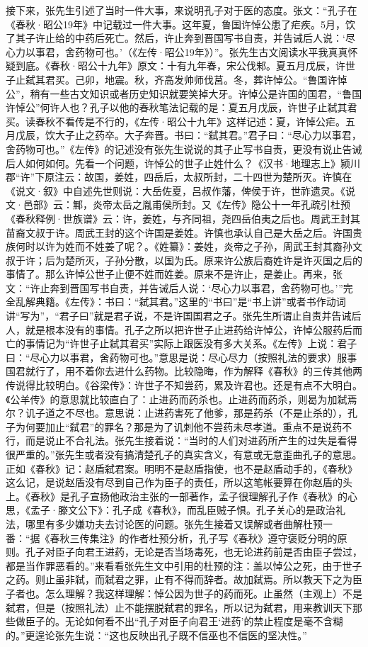 接下来，张先生引述了当时一件大事，来说明孔子对于医的态度。张文：“孔子在《春秋·昭公19年》中记载过一件大事。这年夏，鲁国许悼公患了疟疾。5月，饮了其子许止给的中药后死亡。然后，许止奔到晋国写书自责，并告诫后人说：‘尽心力以事君，舍药物可也。’（《左传·昭公19年》）”。张先生古文阅读水平我真真怀疑到底。《春秋·昭公十九年》原文：十有九年春，宋公伐邾。夏五月戊辰，许世子止弑其君买。己卯，地震。秋，齐高发帅师伐莒。冬，葬许悼公。“鲁国许悼公”，稍有一些古文知识或者历史知识就要笑掉大牙。许悼公是许国的国君，“鲁国许悼公”何许人也？孔子以他的春秋笔法记载的是：夏五月戊辰，许世子止弑其君买。读春秋不看传是不行的，《左传·昭公十九年》这样记述：夏，许悼公疟。五月戊辰，饮大子止之药卒。大子奔晋。书曰：“弑其君。”君子曰：“尽心力以事君，舍药物可也。”《左传》的记述没有张先生说说的其子止写书自责，更没有说止告诫后人如何如何。先看一个问题，许悼公的世子止姓什么？《汉书·地理志上》颍川郡“许”下原注云：故国，姜姓，四岳后，太叔所封，二十四世为楚所灭。许慎在《说文·叙》中自述先世则说：大岳佐夏，吕叔作藩，俾侯于许，世祚遗灵。《说文·邑部》云：鄦，炎帝太岳之胤甫侯所封。又《左传》隐公十一年孔疏引杜预《春秋释例·世族谱》云：许，姜姓，与齐同祖，尧四岳伯夷之后也。周武王封其苗裔文叔于许。周武王封的这个许国是姜姓。许慎也承认自己是大岳之后。许国贵族何时以许为姓而不姓姜了呢？。《姓纂》：姜姓，炎帝之子孙，周武王封其裔孙文叔于许；后为楚所灭，子孙分散，以国为氏。原来许公族后裔姓许是许灭国之后的事情了。那么许悼公世子止便不姓而姓姜。原来不是许止，是姜止。再来，张文：“许止奔到晋国写书自责，并告诫后人说：‘尽心力以事君，舍药物可也。’”完全乱解典籍。《左传》：书曰：“弑其君。”这里的“书曰”是“书上讲”或者书作动词讲“写为”，“君子曰”就是君子说，不是许国国君之子。张先生所谓止自责并告诫后人，就是根本没有的事情。孔子之所以把许世子止进药给许悼公，许悼公服药后而亡的事情记为“许世子止弑其君买”实际上跟医没有多大关系。《左传》上说：君子曰：“尽心力以事君，舍药物可也。”意思是说：尽心尽力（按照礼法的要求）服事国君就行了，用不着你去进什么药物。比较隐晦，作为解释《春秋》的三传其他两传说得比较明白。《谷梁传》：许世子不知尝药，累及许君也。还是有点不大明白。《公羊传》的意思就比较直白了：止进药而药杀也。止进药而药杀，则曷为加弑焉尔？讥子道之不尽也。意思说：止进药害死了他爹，那是药杀（不是止杀的），孔子为何要加止“弑君”的罪名？那是为了讥刺他不尝药未尽孝道。重点不是说药不行，而是说止不合礼法。张先生接着说：“当时的人们对进药所产生的过失是看得很严重的。”张先生或者没有搞清楚孔子的真实含义，有意或无意歪曲孔子的意思。正如《春秋》记：赵盾弑君案。明明不是赵盾指使，也不是赵盾动手的，《春秋》这么记，是说赵盾没有尽到自己作为臣子的责任，所以这笔帐要算在你赵盾的头上。《春秋》是孔子宣扬他政治主张的一部著作，孟子很理解孔子作《春秋》的心思，《孟子·滕文公下》：孔子成《春秋》，而乱臣贼子惧。孔子关心的是政治礼法，哪里有多少嫌功夫去讨论医的问题。张先生接着又误解或者曲解杜预一番：“据《春秋三传集注》的作者杜预分析，孔子写《春秋》遵守褒贬分明的原则。孔子对臣子向君王进药，无论是否当场毒死，也无论进药前是否由臣子尝过，都是当作罪恶看的。”来看看张先生文中引用的杜预的注：盖以悼公之死，由于世子之药。则止虽非弑，而弑君之罪，止有不得而辞者。故加弑焉。所以教天下之为臣子者也。怎么理解？我这样理解：悼公因为世子的药而死。止虽然（主观上）不是弑君，但是（按照礼法）止不能摆脱弑君的罪名，所以记为弑君，用来教训天下那些做臣子的。无论如何看不出“孔子对臣子向君王‘进药’的禁止程度是毫不含糊的。”更遑论张先生说：“这也反映出孔子既不信巫也不信医的坚决性。”

